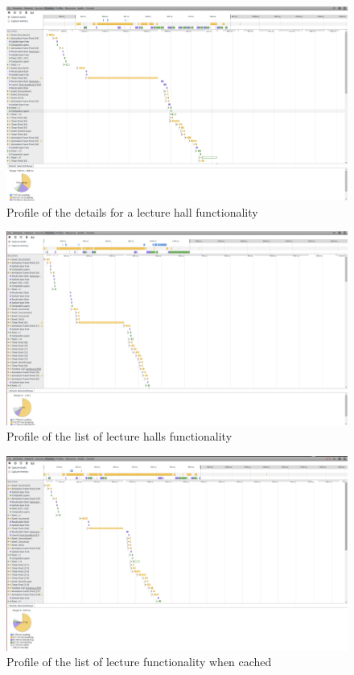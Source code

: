 \documentclass{eplmastersthesis}
\begin{document}
\begin{figure}[H]
\centering
\includegraphics[scale = 0.15]{Images/lecturehalldetail.png}
\caption{Profile of the details for a lecture hall functionality}
\end{figure}
\begin{figure}[H]
\centering
\includegraphics[scale = 0.15]{Images/lecturehalls.png}
\caption{Profile of the list of lecture halls functionality}
\end{figure}
\begin{figure}[H]
\centering
\includegraphics[scale = 0.15]{Images/lecturehallscached.png}
\caption{Profile of the list of lecture functionality when cached}
\end{figure}
\end{document}
